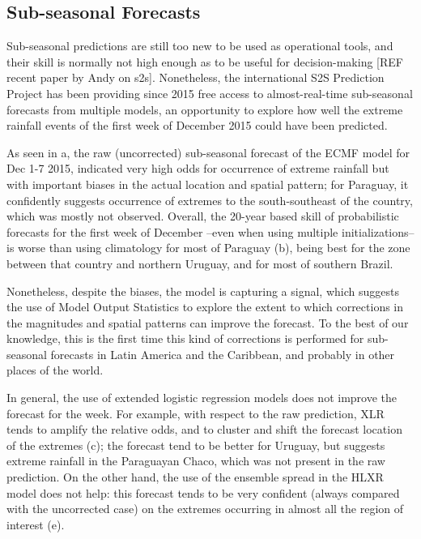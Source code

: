 \documentclass[twocol]{ametsoc}
\begin{document}
\subsection{Sub-seasonal Forecasts}
Sub-seasonal predictions are still too new to be used as operational tools, and their skill is normally not high enough as to be useful for decision-making [REF recent paper by Andy on s2s]. Nonetheless, the international S2S Prediction Project \citep{Vitart2016} has been providing since 2015 free access to almost-real-time sub-seasonal forecasts from multiple models, an opportunity to explore how well the extreme rainfall events of the first week of December 2015 could have been predicted.

As seen in a, the raw (uncorrected) sub-seasonal forecast of the ECMF model for Dec 1-7 2015, indicated very high odds for occurrence of extreme rainfall but with important biases in the actual location and spatial pattern; for Paraguay, it confidently suggests occurrence of extremes to the south-southeast of the country, which was mostly not observed. Overall, the 20-year based skill of probabilistic forecasts for the first week of December --even when using multiple initializations-- is worse than using climatology for most of Paraguay (b), being best for the zone between that country and northern Uruguay, and for most of southern Brazil.

Nonetheless, despite the biases, the model is capturing a signal, which suggests the use of Model Output Statistics to explore the extent to which corrections in the magnitudes and spatial patterns can improve the forecast. To the best of our knowledge, this is the first time this kind of corrections is performed for sub-seasonal forecasts in Latin America and the Caribbean, and probably in other places of the world.

In general, the use of extended logistic regression models does not improve the forecast for the week. For example, with respect to the raw prediction, XLR tends to amplify the relative odds, and to cluster and shift the forecast location of the extremes (c); the forecast tend to be better for Uruguay, but suggests extreme rainfall in the Paraguayan Chaco, which was not present in the raw prediction. On the other hand, the use of the ensemble spread in the HLXR model does not help: this forecast tends to be very confident (always compared with the uncorrected case) on the extremes occurring in almost all the region of interest (e).
\end{document}
